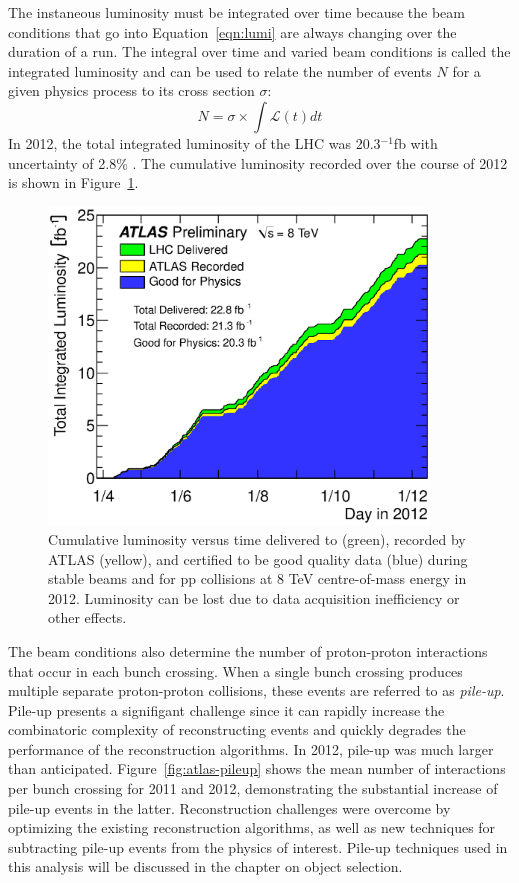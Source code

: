 The instaneous luminosity must be integrated over time because the beam conditions that go into Equation~\ref{eqn:lumi} are always changing over the duration of a run. The integral over time and varied beam conditions is called the integrated luminosity and can be used to relate the number of events $N$ for a given physics process to its cross section $\sigma$:
\begin{equation}\label{eqn:nevt}
  N = \sigma \times \int{\mathcal{L}(t) dt}
\end{equation}
In 2012, the total integrated luminosity of the LHC was 20.3$^{-1}$fb with uncertainty of 2.8\% \cite{Lumi}. The cumulative luminosity recorded over the course of 2012 is shown in Figure~\ref{fig:2012lumi}.
\begin{figure}[tp]
  \centering
  \includegraphics[width=0.90\textwidth]{fig/atlas/intlumivstime2012DQ.eps}
  \caption{Cumulative luminosity versus time delivered to (green), recorded by ATLAS (yellow), and certified to be good quality data (blue) during stable beams and for pp collisions at 8 TeV centre-of-mass energy in 2012. Luminosity can be lost due to data acquisition inefficiency or other effects.}
  \label{fig:2012lumi}
\end{figure}

The beam conditions also determine the number of proton-proton interactions that occur in each bunch crossing. When a single bunch crossing produces multiple separate proton-proton collisions, these events are referred to as \textit{pile-up}. Pile-up presents a signifigant challenge since it can rapidly increase the combinatoric complexity of reconstructing events and quickly degrades the performance of the reconstruction algorithms. In 2012, pile-up was much larger than anticipated. Figure~\ref{fig:atlas-pileup} shows the mean number of interactions per bunch crossing for 2011 and 2012, demonstrating the substantial increase of pile-up events in the latter. Reconstruction challenges were overcome by optimizing the existing reconstruction algorithms, as well as new techniques for subtracting pile-up events from the physics of interest. Pile-up techniques used in this analysis will be discussed in the chapter on object selection.


